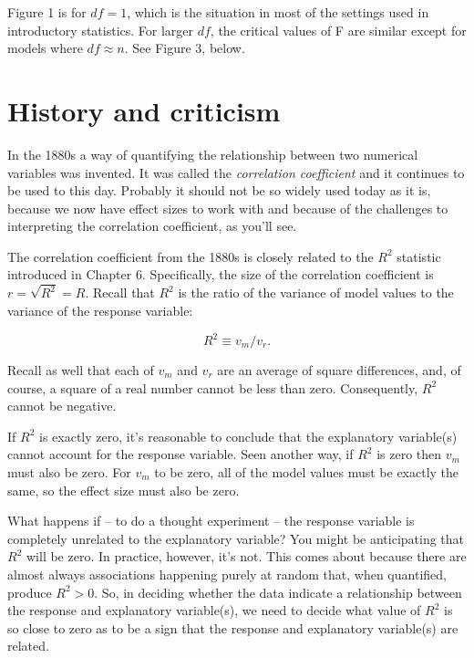 \documentclass[]{book}
\begin{document}
Figure 1 is for \(df = 1\), which is the situation in most of the settings used in introductory statistics. For larger \(df\), the critical values of F are similar except for models where \(df \approx n\). See Figure 3, below.

\hypertarget{history-and-criticism}{%
\section{History and criticism}\label{history-and-criticism}}

In the 1880s a way of quantifying the relationship between two numerical variables was invented. It was called the \emph{correlation coefficient} and it continues to be used to this day. Probably it should not be so widely used today as it is, because we now have effect sizes to work with and because of the challenges to interpreting the correlation coefficient, as you'll see.

The correlation coefficient from the 1880s is closely related to the \(R^2\) statistic introduced in Chapter 6. Specifically, the size of the correlation coefficient is \(r = \sqrt{R^2} = R\). Recall that \(R^2\) is the ratio of the variance of model values to the variance of the response variable:

\[R^2 \equiv v_m / v_r.\]

Recall as well that each of \(v_m\) and \(v_r\) are an average of square differences, and, of course, a square of a real number cannot be less than zero. Consequently, \(R^2\) cannot be negative.

If \(R^2\) is exactly zero, it's reasonable to conclude that the explanatory variable(s) cannot account for the response variable. Seen another way, if \(R^2\) is zero then \(v_m\) must also be zero. For \(v_m\) to be zero, all of the model values must be exactly the same, so the effect size must also be zero.

What happens if -- to do a thought experiment -- the response variable is completely unrelated to the explanatory variable? You might be anticipating that \(R^2\) will be zero. In practice, however, it's not. This comes about because there are almost always associations happening purely at random that, when quantified, produce \(R^2 > 0\). So, in deciding whether the data indicate a relationship between the response and explanatory variable(s), we need to decide what value of \(R^2\) is so close to zero as to be a sign that the response and explanatory variable(s) are related.
\end{document}
